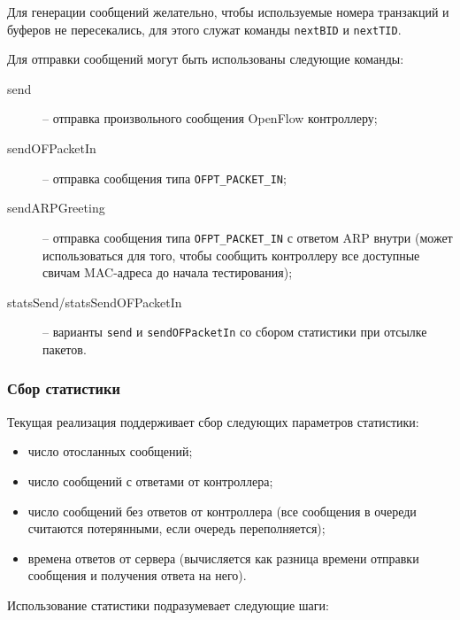 \documentclass[9pt,a4paper]{article}
\begin{document}
Для генерации сообщений желательно, чтобы используемые номера транзакций и буферов 
не пересекались, для этого служат команды \lstinline!nextBID! и \lstinline!nextTID!.

Для отправки сообщений могут быть использованы следующие команды:

\begin{description}

  \item[send] -- отправка произвольного сообщения OpenFlow контроллеру;

  \item[sendOFPacketIn] -- отправка сообщения типа \lstinline!OFPT_PACKET_IN!;

  \item[sendARPGreeting] -- отправка сообщения типа \lstinline!OFPT_PACKET_IN!
    с ответом ARP внутри (может использоваться для того, чтобы сообщить контроллеру все доступные свичам MAC-адреса до начала тестирования);

  \item[statsSend/statsSendOFPacketIn] -- варианты \lstinline!send! и
    \lstinline!sendOFPacketIn! со сбором статистики при отсылке пакетов.

\end{description}

\subsubsection{Сбор статистики}

Текущая реализация поддерживает сбор следующих параметров статистики:

\begin{itemize}
  \item число отосланных сообщений;
  \item число сообщений с ответами от контроллера;
  \item число сообщений без ответов от контроллера (все сообщения в очереди считаются потерянными, если очередь переполняется);
  \item времена ответов от сервера (вычисляется как разница времени отправки сообщения
    и получения ответа на него).
\end{itemize}

Использование статистики подразумевает следующие шаги:
\end{document}
